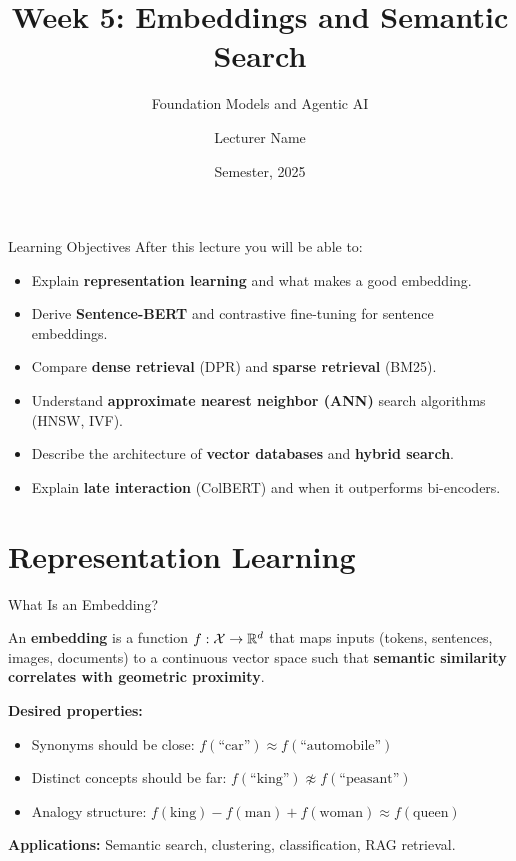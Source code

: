\documentclass[aspectratio=169,10pt]{beamer}
\title{Week 5: Embeddings and Semantic Search}
\subtitle{Foundation Models and Agentic AI}
\author{Lecturer Name}
\institute{Holon Institute of Technology (HIT)}
\date{Semester, 2025}
\begin{document}
\begin{frame}
  \titlepage
\end{frame}

\begin{frame}{Learning Objectives}
  After this lecture you will be able to:
  \begin{itemize}
    \item Explain \textbf{representation learning} and what makes a good embedding.
    \item Derive \textbf{Sentence-BERT} and contrastive fine-tuning for sentence embeddings.
    \item Compare \textbf{dense retrieval} (DPR) and \textbf{sparse retrieval} (BM25).
    \item Understand \textbf{approximate nearest neighbor (ANN)} search algorithms (HNSW, IVF).
    \item Describe the architecture of \textbf{vector databases} and \textbf{hybrid search}.
    \item Explain \textbf{late interaction} (ColBERT) and when it outperforms bi-encoders.
  \end{itemize}
\end{frame}

\section{Representation Learning}

\begin{frame}{What Is an Embedding?}
  \begin{tcolorbox}[hitbox, title=Definition]
    An \textbf{embedding} is a function $f: \mathcal{X} \to \mathbb{R}^d$ that maps inputs
    (tokens, sentences, images, documents) to a continuous vector space such that
    \textbf{semantic similarity correlates with geometric proximity}.
  \end{tcolorbox}
  \vspace{0.4em}
  \textbf{Desired properties:}
  \begin{itemize}
    \item Synonyms should be close: $f(\text{``car''}) \approx f(\text{``automobile''})$
    \item Distinct concepts should be far: $f(\text{``king''}) \not\approx f(\text{``peasant''})$
    \item Analogy structure: $f(\text{king}) - f(\text{man}) + f(\text{woman}) \approx f(\text{queen})$
  \end{itemize}
  \vspace{0.3em}
  \textbf{Applications:} Semantic search, clustering, classification, RAG retrieval.
\end{frame}
\end{document}
